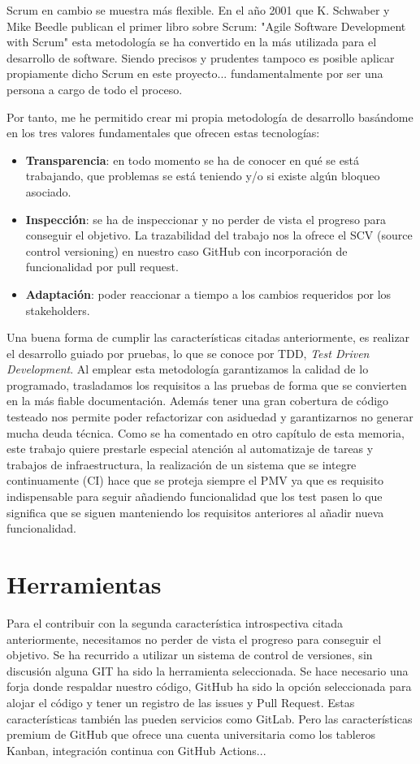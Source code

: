 Scrum en cambio se muestra más flexible. En el año 2001 que K. Schwaber y Mike Beedle
publican el primer libro sobre Scrum\cite{agile_book}: "Agile Software Development with
Scrum" esta metodología se ha convertido en la más utilizada para el desarrollo de
software. Siendo precisos y prudentes tampoco es posible aplicar propiamente dicho Scrum
en este proyecto... fundamentalmente por ser una persona a cargo de todo el proceso.

Por tanto, me he permitido crear mi propia metodología de desarrollo basándome en los tres
valores fundamentales que ofrecen estas tecnologías:
\begin{itemize}
    \item \textbf{Transparencia}: en todo momento se ha de conocer en qué se está
    trabajando, que problemas se está teniendo y/o si existe algún bloqueo asociado.
    \item \textbf{Inspección}: se ha de inspeccionar y no perder de vista el progreso para
    conseguir el objetivo. La trazabilidad del trabajo nos la ofrece el SCV (source
    control versioning) en nuestro caso GitHub con incorporación de funcionalidad por pull
    request.
    \item \textbf{Adaptación}: poder reaccionar a tiempo a los cambios requeridos por los
    stakeholders.
\end{itemize}

Una buena forma de cumplir las características citadas anteriormente, es realizar el
desarrollo guiado por pruebas, lo que se conoce por TDD, \textit{Test Driven Development}.
Al emplear esta metodología garantizamos la calidad de lo programado, trasladamos los
requisitos a las pruebas de forma que se convierten en la más fiable documentación. Además
tener una gran cobertura de código testeado nos permite poder refactorizar con asiduedad y
garantizarnos no generar mucha deuda técnica. Como se ha comentado en otro capítulo de
esta memoria, este trabajo quiere prestarle especial atención al automatizaje de tareas y
trabajos de infraestructura, la realización de un sistema que se integre continuamente
(CI) hace que se proteja siempre el PMV ya que es requisito indispensable para seguir
añadiendo funcionalidad que los test pasen lo que significa que se siguen manteniendo los
requisitos anteriores al añadir nueva funcionalidad.

\section{Herramientas}
Para el contribuir con la segunda característica introspectiva citada anteriormente,
necesitamos no perder de vista el progreso para conseguir el objetivo. Se ha recurrido a
utilizar un sistema de control de versiones, sin discusión alguna GIT ha sido la
herramienta seleccionada. Se hace necesario una forja donde respaldar nuestro código,
GitHub ha sido la opción seleccionada para alojar el código y tener un registro de las
issues y Pull Request. Estas características también las pueden servicios como GitLab.
Pero las características premium de GitHub que ofrece una cuenta universitaria como los
tableros Kanban, integración continua con GitHub Actions...

